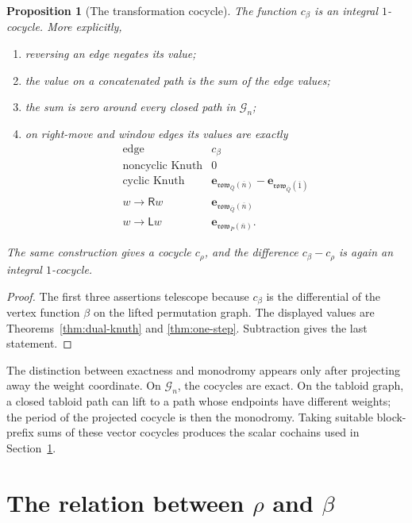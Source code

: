 \documentclass[11pt]{article}
\newtheorem{proposition}[theorem]{Proposition}
\theoremstyle{definition}
\theoremstyle{remark}
\newcommand{\ol}[1]{\overline{#1}}
\newcommand{\row}{\mathfrak{row}}
\newcommand{\e}{\mathbf e}
\newcommand{\Rop}{\mathsf R}
\newcommand{\Lop}{\mathsf L}
\begin{document}
\begin{proposition}[The transformation cocycle]\label{prop:beta-cocycle}
The function \(c_\beta\) is an integral \(1\)-cocycle.  More explicitly,
\begin{enumerate}[label=(\roman*),leftmargin=2.2em]
\item reversing an edge negates its value;
\item the value on a concatenated path is the sum of the edge values;
\item the sum is zero around every closed path in \(\mathcal G_n\);
\item on right-move and window edges its values are exactly
\begin{equation}\label{eq:beta-cocycle-values}
 \begin{array}{c|c}
 \text{edge}&c_\beta\\ \hline
 \text{noncyclic Knuth}&0\\
 \text{cyclic Knuth}&
   \e_{\row_{\bar Q}(\ol n)}-\e_{\row_{\bar Q}(\ol1)}\\
 w\to\Rop w&\e_{\row_{\bar Q}(\ol n)}\\
 w\to\Lop w&\e_{\row_{\bar P}(\ol n)}.
 \end{array}
\end{equation}
\end{enumerate}
The same construction gives a cocycle \(c_\rho\), and the difference
\(c_\beta-c_\rho\) is again an integral \(1\)-cocycle.
\end{proposition}

\begin{proof}
The first three assertions telescope because \(c_\beta\) is the differential of the
vertex function \(\beta\) on the lifted permutation graph.  The displayed values are
Theorems~\ref{thm:dual-knuth} and \ref{thm:one-step}.  Subtraction gives the last
statement.
\end{proof}

The distinction between exactness and monodromy appears only after projecting away the
weight coordinate.  On \(\mathcal G_n\), the cocycles are exact.  On the tabloid graph,
a closed tabloid path can lift to a path whose endpoints have different weights; the
period of the projected cocycle is then the monodromy.  Taking suitable block-prefix
sums of these vector cocycles produces the scalar cochains used in
Section~\ref{sec:comparison}.

\section{The relation between \texorpdfstring{\(\rho\)}{rho} and
\texorpdfstring{\(\beta\)}{beta}}\label{sec:comparison}
\end{document}
